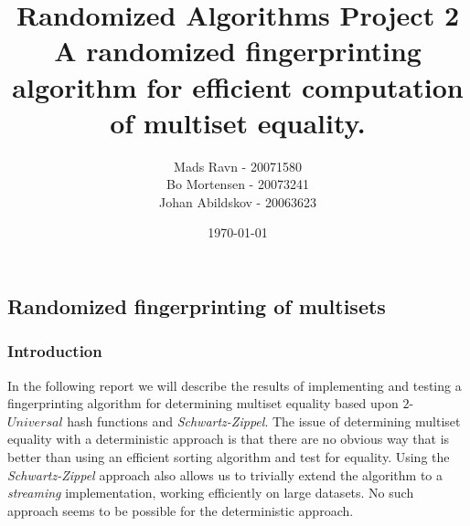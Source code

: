 \documentclass[article,a4paper,oneside]{article}
\newcommand{\+}[1]{\ensuremath{\boldsymbol{#1}}}
\begin{document}
\title{
Randomized Algorithms Project 2\\
A randomized fingerprinting algorithm for efficient computation of multiset equality.
}

\author{
  Mads Ravn - 20071580\\
  Bo Mortensen - 20073241\\
  Johan Abildskov - 20063623
}

\date{\today}

\maketitle

\newpage

\subsection*{Randomized fingerprinting of multisets}
\subsubsection*{Introduction}
In the following report we will describe the results of implementing and testing a fingerprinting algorithm for determining multiset equality based upon $2$-$Universal$ hash functions and \emph{Schwartz-Zippel}.
The issue of determining multiset equality with a deterministic approach is that there are no obvious way that is better than using an efficient sorting algorithm and test for equality. Using the \emph{Schwartz-Zippel} approach also allows us to trivially extend the algorithm to a \emph{streaming} implementation, working efficiently on large datasets. No such approach seems to be possible for the deterministic approach.
\end{document}
